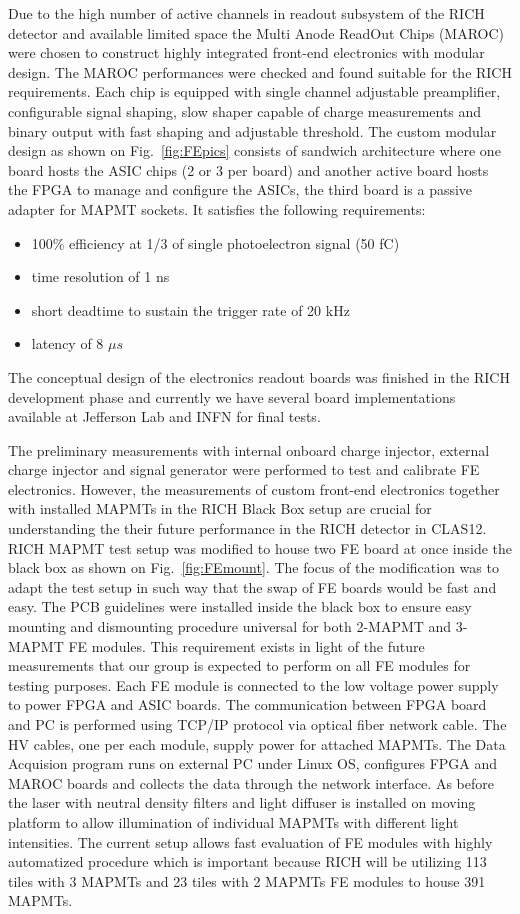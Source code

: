Due to the high number of active channels in readout subsystem of the RICH detector and available limited space the Multi Anode ReadOut Chips (MAROC) were chosen to construct highly integrated front-end electronics with modular design.
The MAROC performances were checked and found suitable for the RICH requirements.
Each chip is equipped with single channel adjustable preamplifier, configurable signal shaping, slow shaper capable of charge measurements and binary output with fast shaping and adjustable threshold.
The custom modular design as shown on Fig.~\ref{fig:FEpics} consists of sandwich architecture where one board hosts the ASIC chips (2 or 3 per board) and another active board hosts the FPGA to manage and configure the ASICs, the third board is a passive adapter for MAPMT sockets.
It satisfies the following requirements:
\begin{itemize}
\item 100\% efficiency at 1/3 of single photoelectron signal (50 fC)
\item time resolution of 1 ns
\item short deadtime to sustain the trigger rate of 20 kHz
\item latency of 8 $\mu s$
\end{itemize}
The conceptual design of the electronics readout boards was finished in the RICH development phase and currently we have several board implementations available at Jefferson Lab and INFN for final tests.

The preliminary measurements with internal onboard charge injector, external charge injector and signal generator were performed to test and calibrate FE electronics.
However, the measurements of custom front-end electronics together with installed MAPMTs in the RICH Black Box setup are crucial for understanding the their future performance in the RICH detector in CLAS12.
RICH MAPMT test setup was modified to house two FE board at once inside the black box as shown on Fig.~\ref{fig:FEmount}.
The focus of the modification was to adapt the test setup in such way that the swap of FE boards would be fast and easy.
The PCB guidelines were installed inside the black box to ensure easy mounting and dismounting procedure universal for both 2-MAPMT and 3-MAPMT FE modules.
This requirement exists in light of the future measurements that our group is expected to perform on all FE modules for testing purposes.
Each FE module is connected to the low voltage power supply to power FPGA and ASIC boards. The communication between FPGA board and PC is performed using TCP/IP protocol via optical fiber network cable.
The HV cables, one per each module, supply power for attached MAPMTs.
The Data Acquision program runs on external PC under Linux OS, configures FPGA and MAROC boards and collects the data through the network interface.
As before the laser with neutral density filters and light diffuser is installed on moving platform to allow illumination of individual MAPMTs with different light intensities.
The current setup allows fast evaluation of FE modules with highly automatized procedure which is important because RICH will be utilizing 113 tiles with 3 MAPMTs and 23 tiles with 2 MAPMTs FE modules to house 391 MAPMTs.

